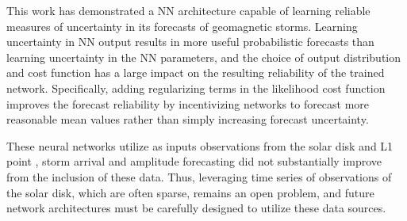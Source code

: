 This work has demonstrated a NN architecture capable of learning reliable measures of uncertainty in its forecasts of geomagnetic storms. Learning uncertainty in NN output results in more useful probabilistic forecasts than learning uncertainty in the NN parameters, and the choice of output distribution and cost function has a large impact on the resulting reliability of the trained network. Specifically, adding regularizing terms in the likelihood cost function improves the forecast reliability by incentivizing networks to forecast more reasonable mean values rather than simply increasing forecast uncertainty.

These neural networks utilize as inputs observations from  the solar disk and L1 point , storm arrival and amplitude forecasting did not substantially improve from the inclusion of these data. Thus, leveraging time series of observations of the solar disk, which are often sparse, remains an open problem, and future network architectures must be carefully designed to utilize these data sources. 